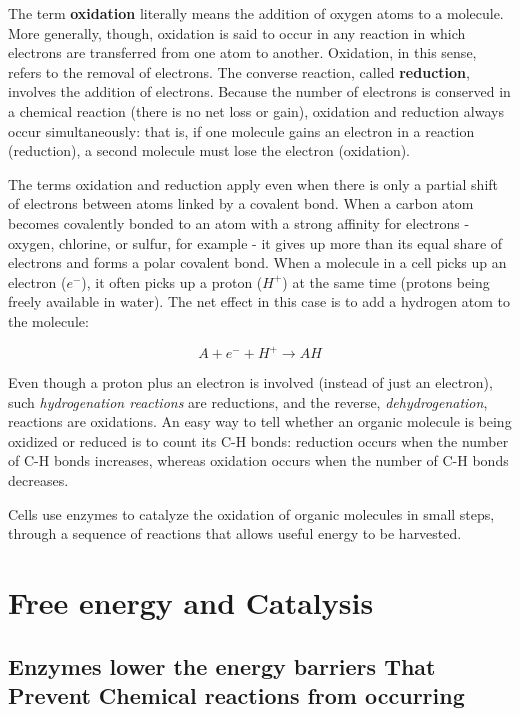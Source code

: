 The term \textbf{oxidation} literally means the addition of oxygen atoms to a
molecule. More generally, though, oxidation is said to occur in any
reaction in which electrons are transferred from one atom to another.
Oxidation, in this sense, refers to the removal of electrons. The converse
reaction, called \textbf{reduction}, involves the addition of electrons.
Because the
number of electrons is conserved in a chemical reaction (there is no net
loss or gain), oxidation and reduction always occur simultaneously: that
is, if one molecule gains an electron in a reaction (reduction), a second
molecule must lose the electron (oxidation).

The terms oxidation and reduction apply even when there is only a partial
shift of electrons between atoms linked by a covalent bond. When a
carbon atom becomes covalently bonded to an atom with a strong affinity
for electrons - oxygen, chlorine, or sulfur, for example - it gives up more
than its equal share of electrons and forms a polar covalent bond.
When a molecule in a cell picks up an electron ($e^{-}$), it often picks up a
proton ($H^{+}$) at the same time (protons being freely available in water).
The net effect in this case is to add a hydrogen atom to the molecule:

\begin{equation}
A + e^{-} +  H^{+} \rightarrow AH
\end{equation}

Even though a proton plus an electron is involved (instead of just an
electron), such \textit{hydrogenation reactions} are reductions, and the reverse,
\textit{dehydrogenation}, reactions are oxidations. An easy way to tell whether an
organic molecule is being oxidized or reduced is to count its C-H bonds:
reduction occurs when the number of C-H bonds increases, whereas oxidation
occurs when the number of C-H bonds decreases.

Cells use enzymes to catalyze the oxidation of organic molecules in small steps,
through a sequence of reactions that allows useful energy to be harvested.

\section{Free energy and Catalysis}

\subsection{Enzymes lower the energy barriers That Prevent Chemical reactions from occurring}

